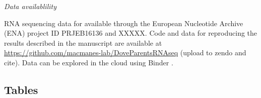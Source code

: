 \emph{Data availablility}

RNA sequencing data for available through the European Nucleotide
Archive (ENA) project ID PRJEB16136 and XXXXX. Code and data for
reproducing the results described in the manuscript are available at
\url{https://github.com/macmanes-lab/DoveParentsRNAseq} (upload to zendo
and cite). Data can be explored in the cloud using Binder
\citep{project_jupyter-proc-scipy-2018}.

\newpage

\hypertarget{tables}{%
\subsection{Tables}\label{tables}}

\begin{Schunk}
\begin{table}


\end{table}
\end{Schunk}
